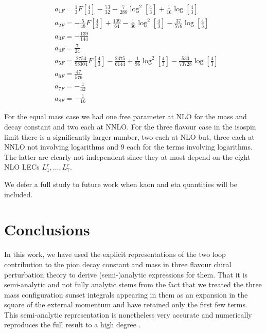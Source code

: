 \documentclass[12pt,a4paper]{article}
\begin{document}
\begin{align}
	& a_{1F} = \frac{1}{3} F\left[\frac{4}{3}\right]-\frac{73}{32}-\frac{7}{288} \log^2 \left[\frac{4}{3}\right] + \frac{1}{16} \log \left[\frac{4}{3}\right] \nonumber \\
	& a_{2F} = -\frac{5}{48} F\left[\frac{4}{3}\right]+\frac{109}{64}-\frac{1}{36} \log ^2\left[\frac{4}{3}\right]-\frac{37}{576} \log \left[\frac{4}{3}\right] \nonumber \\
	& a_{3F} = -\frac{139}{144} \nonumber \\
	& a_{4F} = \frac{7}{24} \nonumber \\
	& a_{5F} = \frac{2753}{98304} F\left[\frac{4}{3}\right]-\frac{2375}{6144}+\frac{1}{96} \log ^2\left[\frac{4}{3}\right]-\frac{533}{73728} \log \left[\frac{4}{3}\right] \nonumber \\
	& a_{6F} = \frac{47}{576} \nonumber \\
	& a_{7F} = -\frac{1}{32} \nonumber \\
	& a_{8F} = -\frac{1}{16}
\end{align}


For the equal mass case we had one free parameter at NLO for the mass
and decay constant and two each at NNLO. For the three flavour case in the
isospin limit there is a significantly larger number, two each at NLO
but, three each at NNLO not involving logarithms and 9 each for the terms
involving logarithms. The latter are clearly not independent since they at
most depend on the eight NLO LECs $L_1^r,\ldots,L_7^r$.

We defer a full study to future work when kaon and eta quantities will be included.



\section{Conclusions \label{SecConc}}

In this work, we have used the explicit representations of the two loop contribution to the pion decay constant and mass in three flavour chiral perturbation theory \cite{Amoros:1999dp} to derive (semi-)analytic expressions for them. That it is semi-analytic and not fully analytic stems from the fact that we treated the three mass configuration sunset integrals appearing in them as an expansion in the square of the external momentum and have retained only the first few terms. This semi-analytic representation is nonetheless very accurate and numerically reproduces the full result to a high degree \cite{Amoros:1999dp, Bijnens:2014gsa}.
\end{document}
